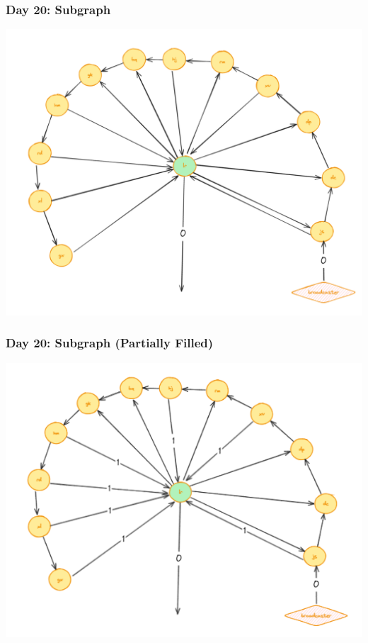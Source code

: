 \begin{frame}
\frametitle{Day 20: Subgraph}

\includegraphics[width=\textwidth]{Day20Subgraph}

\end{frame}

\begin{frame}
\frametitle{Day 20: Subgraph (Partially Filled)}

\includegraphics[width=\textwidth]{Day20SubgraphPartial}

\end{frame}


